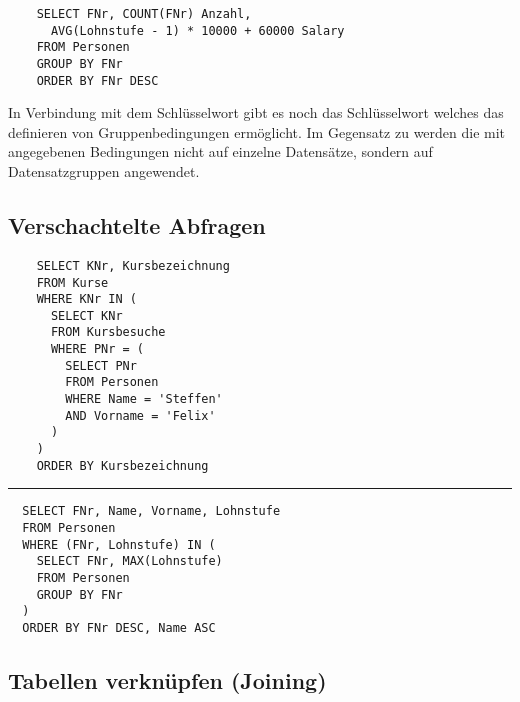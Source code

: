 \documentclass{article}
\begin{document}
\begin{verbatim}
    SELECT FNr, COUNT(FNr) Anzahl, 
      AVG(Lohnstufe - 1) * 10000 + 60000 Salary
    FROM Personen
    GROUP BY FNr
    ORDER BY FNr DESC
\end{verbatim}

\vspace{0.5em}
\begin{flushleft}
  In Verbindung mit dem Schlüsselwort  gibt es noch
  das Schlüsselwort  welches das definieren von Gruppenbedingungen ermöglicht.
  Im Gegensatz zu  werden die mit  angegebenen Bedingungen nicht
  auf einzelne Datensätze, sondern auf Datensatzgruppen angewendet.
\end{flushleft}

\newpage
\subsection{Verschachtelte Abfragen}

\begin{verbatim}
    SELECT KNr, Kursbezeichnung
    FROM Kurse
    WHERE KNr IN (
      SELECT KNr
      FROM Kursbesuche
      WHERE PNr = (
        SELECT PNr
        FROM Personen
        WHERE Name = 'Steffen'
        AND Vorname = 'Felix'
      )
    )
    ORDER BY Kursbezeichnung
\end{verbatim}

\vspace{0.5em}
\hrule
\vspace{0.6em}

\begin{verbatim}
  SELECT FNr, Name, Vorname, Lohnstufe
  FROM Personen
  WHERE (FNr, Lohnstufe) IN (
    SELECT FNr, MAX(Lohnstufe)
    FROM Personen
    GROUP BY FNr
  )
  ORDER BY FNr DESC, Name ASC
\end{verbatim}

\subsection{Tabellen verknüpfen (Joining)}
\end{document}
